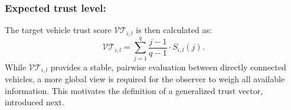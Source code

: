 \documentclass{ifacconf}
\def\eqref#1{(\ref{#1})}
\def\N{\mathcal{N}} %
\def\VT{\mathcal{VT}} %
\def\O{\mathcal{O}} %
\begin{document}
\subsubsection{Expected trust level:}
The target vehicle trust score $\VT_{i,l}$ is then calculated as:
\begin{equation}
    \VT_{i,l} = \sum_{j=1}^{q} \dfrac{j-1}{q-1} \cdot S_{i,l}(j).
\end{equation}
While $\VT_{i,l}$ provides a stable, pairwise evaluation between directly connected vehicles, a more global view is required for the observer to weigh all available information. This motivates the definition of a generalized trust vector, introduced next.


\end{document}
